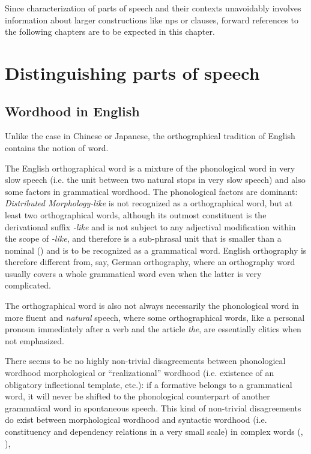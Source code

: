 \documentclass[UTF8, a4paper, oneside, scheme=plain, 12pt]{ctexbook}
\newcommand{\form}[1]{\emph{#1}}
\begin{document}
Since characterization of parts of speech and their contexts unavoidably involves 
information about larger constructions like \acs{np}s or clauses,
forward references to the following chapters are to be expected in this chapter.




\section{Distinguishing parts of speech}\label{sec:pos.find}

\subsection{Wordhood in English}\label{sec:pos.wordhood}

Unlike the case in Chinese or Japanese,
the orthographical tradition of English contains the notion of word.

The English orthographical word is 
a mixture of the phonological word in very slow speech
(i.e. the unit between two natural stops in very slow speech)
and also some factors in grammatical wordhood.
The phonological factors are dominant:
\form{Distributed Morphology-like} is not recognized as a orthographical word,
but at least two orthographical words,
although its outmost constituent is the derivational suffix \form{-like} 
and is not subject to any adjectival modification within the scope of \form{-like},
and therefore is a sub-phrasal unit  
that is smaller than a nominal ()
and is to be recognized as a grammatical word.
English orthography is therefore different from, say, 
German orthography,
where an orthography word usually covers a whole grammatical word 
even when the latter is very complicated.

The orthographical word is also not always necessarily the phonological word 
in more fluent and \emph{natural} speech, 
where some orthographical words, 
like a personal pronoun immediately after a verb 
and the article \form{the}, 
are essentially clitics when not emphasized.

There seems to be no highly non-trivial disagreements between 
phonological wordhood morphological or ``realizational'' wordhood 
(i.e. existence of an obligatory inflectional template, etc.):
if a formative belongs to a grammatical word, 
it will never be shifted to the phonological counterpart of another grammatical word
in spontaneous speech.
This kind of non-trivial disagreements do exist 
between morphological wordhood 
and syntactic wordhood 
(i.e. constituency and dependency relations in a very small scale) 
in complex words (,
), 
\end{document}
